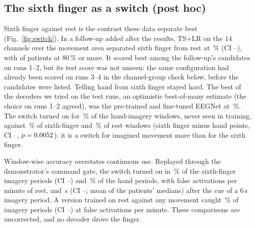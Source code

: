 \subsection{The sixth finger as a switch (post hoc)}
\label{sec:switch}
Sixth finger against rest is the contrast these data separate best
(Fig.~\ref{fig:switch}). In a follow-up added after the results, TS+LR on the
14 channels over the movement area separated sixth finger from rest at
\exFourTsLrCentralMean\,\% (CI \exFourTsLrCentralCiLo--\exFourTsLrCentralCiHi),
with \exFourTsLrCentralNAtLeastEighty{} of \rqFourCueN{} patients at 80\,\% or
more. It scored best among the follow-up's candidates on runs 1--2, but its
test score was not unseen: the same configuration had already been scored on
runs 3--4 in the channel-group check below, before the candidates were
listed. Telling hand from sixth finger stayed hard. The best of the decoders
we tried on the test runs, an optimistic best-of-many estimate (the choice on
runs 1--2 agreed), was the pre-trained and fine-tuned EEGNet at
\exFourAhSfEegnetEaFtMean\,\%. The switch turned on for
\exFourTsLrCentralFiresAhMean\,\% of the hand-imagery windows, never seen in
training, against \exFourTsLrCentralFiresSfMean\,\% of sixth-finger and
\exFourTsLrCentralFiresRestMean\,\% of rest windows (sixth finger minus hand
\exFourTsLrCentralFiresSfVsAhDiff{} points, CI
\exFourTsLrCentralFiresSfVsAhDiffCiLo--\exFourTsLrCentralFiresSfVsAhDiffCiHi,
$p = 0.0052$): it is a switch for imagined movement
more than for the sixth finger.

Window-wise accuracy overstates continuous use. Replayed through the
demonstrator's command gate, the switch turned on in
\exFiveFingerFingerOnMean\,\% of the sixth-finger imagery periods (CI
\exFiveFingerFingerOnCiLo--\exFiveFingerFingerOnCiHi) and
\exFiveFingerHandOnMean\,\% of the hand periods, with
\exFiveFingerFalsePerMinMean{} false activations per minute of rest, and
\exFiveFingerLatencyMean\,s (CI
\exFiveFingerLatencyCiLo--\exFiveFingerLatencyCiHi; mean of the patients'
medians) after the cue of a 6\,s imagery period. A version trained on rest
against any movement caught \exFiveMoveDetectMean\,\% of imagery periods (CI
\exFiveMoveDetectCiLo--\exFiveMoveDetectCiHi) at
\exFiveMoveFalsePerMinMean{} false activations per minute. These comparisons
are uncorrected, and no decoder drove the finger.

